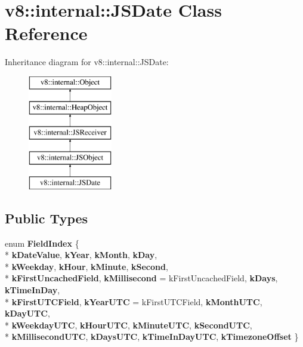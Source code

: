 \hypertarget{classv8_1_1internal_1_1_j_s_date}{}\section{v8\+:\+:internal\+:\+:J\+S\+Date Class Reference}
\label{classv8_1_1internal_1_1_j_s_date}
Inheritance diagram for v8\+:\+:internal\+:\+:J\+S\+Date\+:\begin{figure}[H]
\begin{center}
\leavevmode
\includegraphics[height=5.000000cm]{classv8_1_1internal_1_1_j_s_date}
\end{center}
\end{figure}
\subsection*{Public Types}
\begin{DoxyCompactItemize}
\item 
\hypertarget{classv8_1_1internal_1_1_j_s_date_afc7907b14eb9ef9499498c3b1e19e379}{}enum {\bfseries Field\+Index} \{ \\*
{\bfseries k\+Date\+Value}, 
{\bfseries k\+Year}, 
{\bfseries k\+Month}, 
{\bfseries k\+Day}, 
\\*
{\bfseries k\+Weekday}, 
{\bfseries k\+Hour}, 
{\bfseries k\+Minute}, 
{\bfseries k\+Second}, 
\\*
{\bfseries k\+First\+Uncached\+Field}, 
{\bfseries k\+Millisecond} = k\+First\+Uncached\+Field, 
{\bfseries k\+Days}, 
{\bfseries k\+Time\+In\+Day}, 
\\*
{\bfseries k\+First\+U\+T\+C\+Field}, 
{\bfseries k\+Year\+U\+T\+C} = k\+First\+U\+T\+C\+Field, 
{\bfseries k\+Month\+U\+T\+C}, 
{\bfseries k\+Day\+U\+T\+C}, 
\\*
{\bfseries k\+Weekday\+U\+T\+C}, 
{\bfseries k\+Hour\+U\+T\+C}, 
{\bfseries k\+Minute\+U\+T\+C}, 
{\bfseries k\+Second\+U\+T\+C}, 
\\*
{\bfseries k\+Millisecond\+U\+T\+C}, 
{\bfseries k\+Days\+U\+T\+C}, 
{\bfseries k\+Time\+In\+Day\+U\+T\+C}, 
{\bfseries k\+Timezone\+Offset}
 \}\label{classv8_1_1internal_1_1_j_s_date_afc7907b14eb9ef9499498c3b1e19e379}

\end{DoxyCompactItemize}

